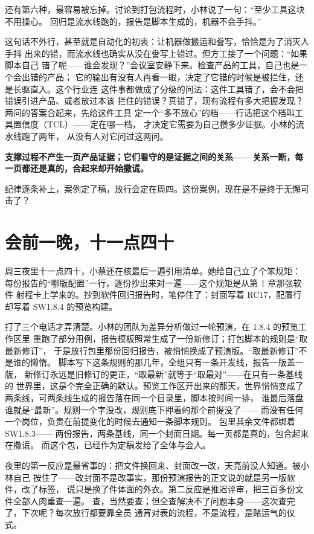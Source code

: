 还有第六种，最容易被忘掉。讨论到打包流程时，小林说了一句：“至少工具这块不用操心。
回归是流水线跑的，报告是脚本生成的，机器不会手抖。”

这句话不外行，甚至就是自动化的初衷：让机器做搬运和誊写，恰恰是为了消灭人手抖
出来的错，而流水线也确实从没在誊写上错过。但方工接了一个问题：“如果脚本自己
错了呢——谁会发现？”会议室安静下来。检查产品的工具，自己也是一个会出错的产品；
它的输出有没有人再看一眼，决定了它错的时候是被拦住，还是长驱直入。这个行业连
这件事都做成了分级的问法：这件工具错了，会不会把错误引进产品、或者放过本该
拦住的错误？真错了，现有流程有多大把握发现？两问的答案合起来，先给这件工具
定一个“多不放心”的档——行话把这个档叫工具置信度（TCL）——定在哪一档，
才决定它需要为自己攒多少证据。小林的流水线跑了两年，
从没有人对它问过这两问。

\textbf{支撑过程不产生一页产品证据；它们看守的是证据之间的关系——关系一断，每一页都还是真的，合起来却开始撒谎。}

纪律逐条补上，案例定了稿，放行会定在周四。这份案例，现在是不是终于无懈可击了？

\section{会前一晚，十一点四十}

周三夜里十一点四十，小蔡还在核最后一遍引用清单。她给自己立了个笨规矩：
每份报告的“哪版配置”一行，逐份抄出来对一遍——这个规矩是从第 1 章那张软件
射程卡上学来的。抄到软件回归报告时，笔停住了：封面写着 RC17，配置行却写着
SW1.8.4 的预览构建。

打了三个电话才弄清楚。小林的团队为差异分析做过一轮预演，在 1.8.4 的预览工作区里
重跑了部分用例，报告模板照常生成了一份新修订；打包脚本的规则是“取最新修订”，
于是放行包里那份回归报告，被悄悄换成了预演版。“取最新修订”不是谁的懒惰。
脚本写下这条规则的那几年，全组只有一条开发线，报告一版盖一版，
新修订永远是旧修订的更正，“取最新”就等于“取最对”——在只有一条基线的
世界里，这是个完全正确的默认。预览工作区开出来的那天，世界悄悄变成了
两条线，可两条线生成的报告落在同一个目录里，脚本按时间一排，
谁最后落盘谁就是“最新”。规则一个字没改，规则底下押着的那个前提没了——
而没有任何一个岗位，负责在前提变化的时候去通知一条脚本规则。
包里其余文件都绑着 SW1.8.3——
两份报告，两条基线，同一个封面日期。每一页都是真的，包合起来在撒谎。
而这个包，已经作为定稿发给了全体与会人。

夜里的第一反应是最省事的：把文件换回来、封面改一改，天亮前没人知道。被小林自己
按住了——改封面不是改事实，那份预演报告的正文说的就是另一版软件，改了标签，
谎只是换了件体面的外衣。第二反应是推迟评审，把三百多份文件全部人肉重查一遍。
查，当然要查；但全查解决不了问题本身——这次查完了，下次呢？每次放行都要靠全员
通宵对表的流程，不是流程，是赌运气的仪式。

